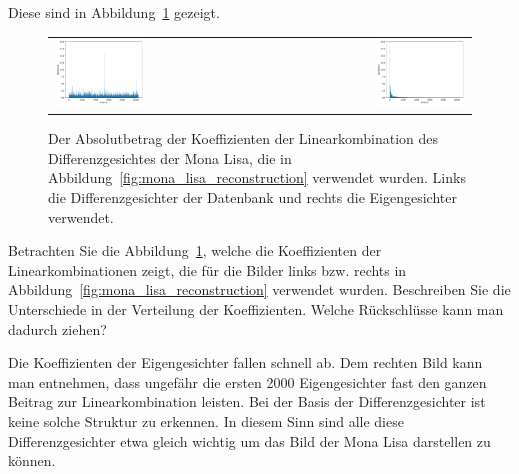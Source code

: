 Diese sind in Abbildung~\ref{fig:coef} gezeigt.
\begin{figure}[ht]
	\centering
	\begin{tabular}{lr}
		\includegraphics[width=0.45\textwidth]{images/eigenfaces/naive_coef} & \includegraphics[width=0.45\textwidth]{images/eigenfaces/eigen_coef} \\
	\end{tabular}
	\caption{Der Absolutbetrag der Koeffizienten der Linearkombination des Differenzgesichtes der Mona Lisa, die in Abbildung~\ref{fig:mona_lisa_reconstruction} verwendet wurden. Links die Differenzgesichter der Datenbank und rechts die Eigengesichter verwendet.}
	\label{fig:coef}
\end{figure}
\begin{aufgabe} \label{aufg:coef}
	Betrachten Sie die Abbildung~\ref{fig:coef}, welche die Koeffizienten der Linearkombinationen zeigt, die für die Bilder links bzw. rechts in Abbildung~\ref{fig:mona_lisa_reconstruction} verwendet wurden.
	Beschreiben Sie die Unterschiede in der Verteilung der Koeffizienten.
	Welche Rückschlüsse kann man dadurch ziehen?
\end{aufgabe}
\begin{losung*}
	Die Koeffizienten der Eigengesichter fallen schnell ab.
	Dem rechten Bild kann man entnehmen, dass ungefähr die ersten 2000 Eigengesichter fast den ganzen Beitrag zur Linearkombination leisten.
	Bei der Basis der Differenzgesichter ist keine solche Struktur zu erkennen.
	In diesem Sinn sind alle diese Differenzgesichter etwa gleich wichtig um das Bild der Mona Lisa darstellen zu können.
\end{losung*}
